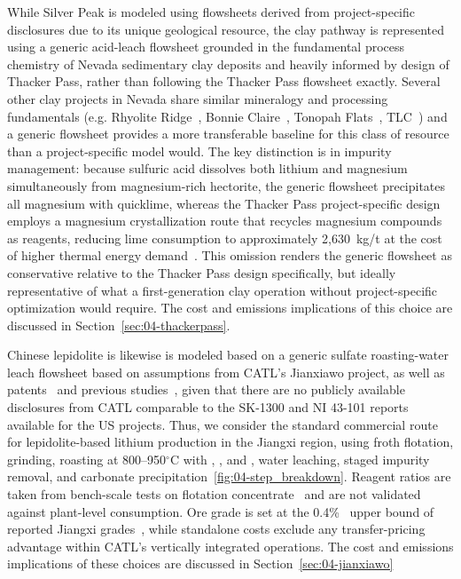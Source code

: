 \documentclass{article}
\renewcommand\_{\textunderscore\allowbreak}
\begin{document}
While Silver Peak is modeled using flowsheets derived from project-specific disclosures due to its unique geological resource, the clay pathway is represented using a generic acid-leach flowsheet grounded in the fundamental process chemistry of Nevada sedimentary clay deposits and heavily informed by design of Thacker Pass, rather than following the Thacker Pass flowsheet exactly. Several other clay projects in Nevada share similar mineralogy and processing fundamentals (e.g. Rhyolite Ridge~\cite{fluorenterprisesRhyoliteRidgeLithiumBoron2022}, Bonnie Claire~\cite{samariMineralResourceEstimate2024}, Tonopah Flats~\cite{dyerAmendedResourceEstimate}, TLC~\cite{riordanFalchaniLithiumProject2024}) and a generic flowsheet provides a more transferable baseline for this class of resource than a project-specific model would. The key distinction is in impurity management: because sulfuric acid dissolves both lithium and magnesium simultaneously from magnesium-rich hectorite, the generic flowsheet precipitates all magnesium with quicklime, whereas the Thacker Pass project-specific design employs a magnesium crystallization route that recycles magnesium compounds as reagents, reducing lime consumption to approximately 2,630~kg/t at the cost of higher thermal energy demand~\cite{sgscanadaincSK1300Technical2024}. This omission renders the generic flowsheet as conservative relative to the Thacker Pass design specifically, but ideally representative of what a first-generation clay operation without project-specific optimization would require. The cost and emissions implications of this choice are discussed in Section~\ref{sec:04-thackerpass}.

Chinese lepidolite is likewise is modeled based on a generic sulfate roasting-water leach flowsheet based on assumptions from CATL's Jianxiawo project, as well as patents~\cite{nanMethodsExtractingLithium2019,nanMethodsExtractingLithium2022,zouMethodEfficientLithium2024} and previous studies~\cite{yanExtractionLithiumLepidolite2012, luongIronSulphateRoasting2014, parkEffectiveLithiumExtraction2023, dengSystematicReviewSulfate2026}, given that there are no publicly available disclosures from CATL comparable to the SK-1300 and NI 43-101 reports available for the US projects. Thus, we consider the standard commercial route for lepidolite-based lithium production in the Jiangxi region, using froth flotation, grinding, roasting at 800--950$^\circ$C with , , and , water leaching, staged impurity removal, and carbonate precipitation~\ref{fig:04-step_breakdown}. Reagent ratios are taken from bench-scale tests on flotation concentrate~\cite{yanExtractionLithiumLepidolite2012, luongIronSulphateRoasting2014} and are not validated against plant-level consumption. Ore grade is set at the 0.4\%~ upper bound of reported Jiangxi grades~\cite{sulcaLithiumPricesWhere2024}, while standalone costs exclude any transfer-pricing advantage within CATL's vertically integrated operations. The cost and emissions implications of these choices are discussed in Section~\ref{sec:04-jianxiawo}
\end{document}
